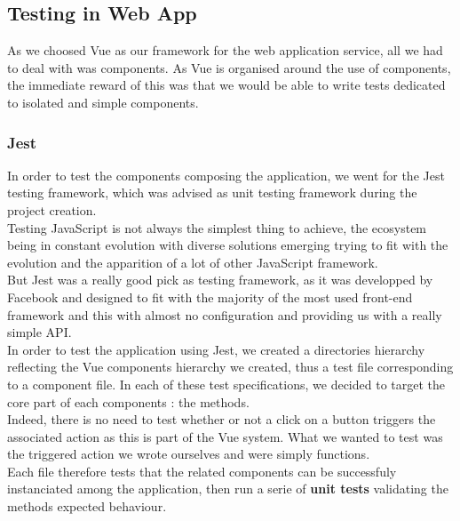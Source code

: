 \documentclass{eplmastersthesis}
\begin{document}
      \subsection{Testing in Web App}

        As we choosed Vue as our framework for the web application service,
        all we had to deal with was components. As Vue is organised around
        the use of components, the immediate reward of this was that we would
        be able to write tests dedicated to isolated and simple components.

        \subsubsection{Jest}

          In order to test the components composing the application, we
          went for the Jest \cite{jest} testing framework, which was advised
          as unit testing framework during the project creation.\\

          Testing JavaScript is not always the simplest thing to achieve, the
          ecosystem being in constant evolution with diverse solutions emerging
          trying to fit with the evolution and the apparition of a lot of
          other JavaScript framework.\\
          But Jest was a really good pick as testing framework, as it was
          developped by Facebook and designed to fit with the majority of the
          most used front-end framework and this with almost no configuration and
          providing us with a really simple API.\\

          In order to test the application using Jest, we created a directories
          hierarchy reflecting the Vue components hierarchy we created, thus
          a test file corresponding to a component file. In each of these
          test specifications, we decided to target the core part of each
          components : the methods.\\
          Indeed, there is no need to test whether or not a click on a button
          triggers the associated action as this is part of the Vue system. What
          we wanted to test was the triggered action we wrote ourselves and
          were simply functions.\\
          Each file therefore tests that the related components can be
          successfuly instanciated among the application, then run a serie
          of \textbf{unit tests} validating the methods expected behaviour.
\end{document}
